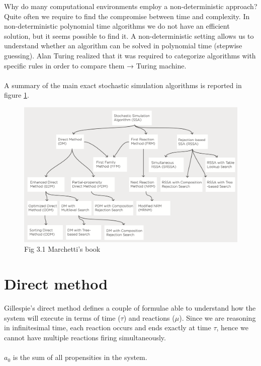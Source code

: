 \noindent
Why do many computational environments employ a non-deterministic approach? Quite often we require to find the compromise between time and complexity.
In non-deterministic polynomial time algorithms we do not have an efficient solution, but it seems possible to find it.
A non-deterministic setting allows us to understand whether an algorithm can be solved in polynomial time (stepwise guessing).
Alan Turing realized that it was required to categorize algorithms with specific rules in order to compare them → Turing machine.
\\
\\
\noindent
A summary of the main exact stochastic simulation algorithms is reported in figure \ref{fig:tree}.
\begin{figure}
  \centering
  \includegraphics[width=\textwidth]{tree_methods.png}
  \caption{Fig 3.1 Marchetti's book}
  \label{fig:tree}
\end{figure}

\section{Direct method}
Gillespie's direct method defines a couple of formulae able to understand how the system will execute in terms of time ($\tau$) and reactions ($\mu$).
Since we are reasoning in infinitesimal time, each reaction occurs and ends exactly at time $\tau$, hence we cannot have multiple reactions firing simultaneously.
\\
\\
\noindent
 $a_0$ is the sum of all propensities in the system.

